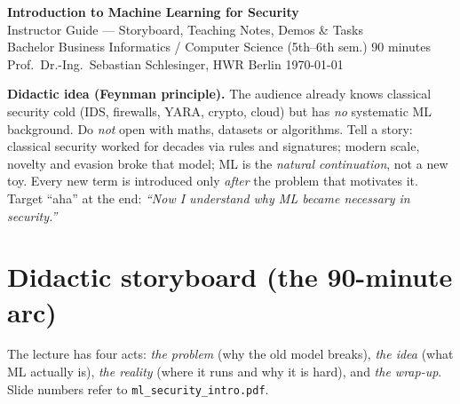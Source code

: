 \documentclass[11pt,a4paper]{article}
\begin{document}
\begin{center}
  {\LARGE\bfseries Introduction to Machine Learning for Security}\\[0.3em]
  {\large Instructor Guide --- Storyboard, Teaching Notes, Demos \& Tasks}\\[0.4em]
  Bachelor Business Informatics / Computer Science (5th--6th sem.) \hfill 90 minutes\\
  Prof.\ Dr.-Ing.\ Sebastian Schlesinger, HWR Berlin \hfill \today
\end{center}
\vspace{0.4em}

\begin{note}
\textbf{Didactic idea (Feynman principle).} The audience already knows classical
security cold (IDS, firewalls, YARA, crypto, cloud) but has \emph{no} systematic
ML background. Do \emph{not} open with maths, datasets or algorithms. Tell a
story: classical security worked for decades via rules and signatures; modern
scale, novelty and evasion broke that model; ML is the \emph{natural
continuation}, not a new toy. Every new term is introduced only \emph{after} the
problem that motivates it. Target ``aha'' at the end: \emph{``Now I understand
why ML became necessary in security.''}
\end{note}

\tableofcontents
\bigskip

\section{Didactic storyboard (the 90-minute arc)}

The lecture has four acts: \emph{the problem} (why the old model breaks),
\emph{the idea} (what ML actually is), \emph{the reality} (where it runs and why
it is hard), and \emph{the wrap-up}. Slide numbers refer to
\texttt{ml\_security\_intro.pdf}.
\end{document}
